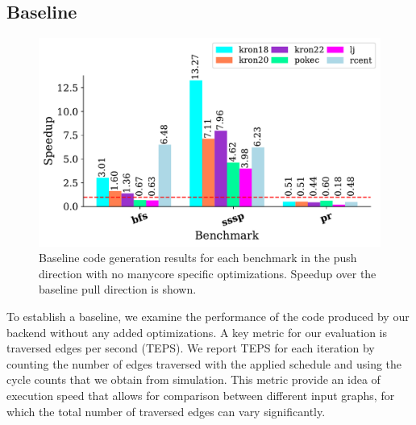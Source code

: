 \subsection{Baseline}
 
\begin{figure}[h!]
    \centering
    \includegraphics[scale = 0.6]{graphit-figures/push.pdf}
    \caption{Baseline code generation results for each benchmark in the push direction with no manycore specific optimizations. Speedup over the baseline pull direction is shown.}
    \label{pap:generals:sec:eval:fig:push}
\end{figure}
To establish a baseline, we examine the performance of the code produced by our backend without any added optimizations.
A key metric for our evaluation is traversed edges per second (TEPS).
We report TEPS for each iteration by counting the number of edges traversed with the applied \graphit schedule and using the cycle counts that we obtain from simulation.
This metric provide an idea of execution speed that allows for comparison between different input graphs, for which the total number of traversed edges can vary significantly.

